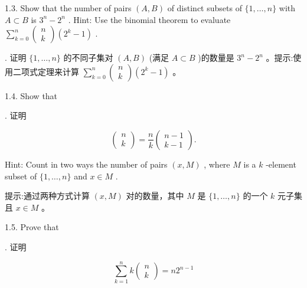 \documentclass[10pt]{article}
\begin{document}
1.3. Show that the number of pairs \(\left( {A,B}\right)\) of distinct subsets of \(\{ 1,\ldots ,n\}\) with \(A \subset  B\) is \({3}^{n} - {2}^{n}\) . Hint: Use the binomial theorem to evaluate \(\mathop{\sum }\limits_{{k = 0}}^{n}\left( \begin{array}{l} n \\  k \end{array}\right) \left( {{2}^{k} - 1}\right)\) .

\begin{tcolorbox}. 证明 \(\{ 1,\ldots ,n\}\) 的不同子集对 \(\left( {A,B}\right)\) (满足 \(A \subset  B\) )的数量是 \({3}^{n} - {2}^{n}\) 。提示:使用二项式定理来计算 \(\mathop{\sum }\limits_{{k = 0}}^{n}\left( \begin{array}{l} n \\  k \end{array}\right) \left( {{2}^{k} - 1}\right)\) 。
\end{tcolorbox}

1.4. Show that

\begin{tcolorbox}. 证明
\end{tcolorbox}

\[
\left( \begin{array}{l} n \\  k \end{array}\right)  = \frac{n}{k}\left( \begin{array}{l} n - 1 \\  k - 1 \end{array}\right) .
\]

Hint: Count in two ways the number of pairs \(\left( {x,M}\right)\) , where \(M\) is a \(k\) -element subset of \(\{ 1,\ldots ,n\}\) and \(x \in  M\) .

\begin{tcolorbox}\relax
提示:通过两种方式计算 \(\left( {x,M}\right)\) 对的数量，其中 \(M\) 是 \(\{ 1,\ldots ,n\}\) 的一个 \(k\) 元子集且 \(x \in  M\) 。
\end{tcolorbox}

1.5. Prove that

\begin{tcolorbox}. 证明
\end{tcolorbox}

\[
\mathop{\sum }\limits_{{k = 1}}^{n}k\left( \begin{array}{l} n \\  k \end{array}\right)  = n{2}^{n - 1}
\]
\end{document}
